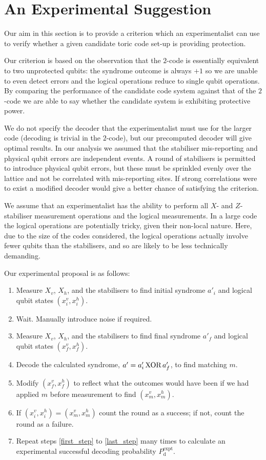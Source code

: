 \section{An Experimental Suggestion}

Our aim in this section is to provide a criterion which an experimentalist can use to verify whether a given candidate toric code set-up is providing protection.

Our criterion is based on the observation that the $2$-code is essentially equivalent to two unprotected qubits: the syndrome outcome is always $+1$ so we are unable to even detect errors and the logical operations reduce to single qubit operations. By comparing the performance of the candidate code system against that of the $2$-code we are able to say whether the candidate system is exhibiting protective power. 

We do not specify the decoder that the experimentalist must use for the larger code (decoding is trivial in the $2$-code), but our precomputed decoder will give optimal results. In our analysis we assumed that the stabiliser mis-reporting and physical qubit errors are independent events. A round of stabilisers is permitted to introduce physical qubit errors, but these must be sprinkled evenly over the lattice and not be correlated with mis-reporting sites. If strong correlations were to exist a modified decoder would give a better chance of satisfying the criterion.

We assume that an experimentalist has the ability to perform all $X$- and $Z$-stabiliser measurement operations and the logical measurements. In a large code the logical operations are potentially tricky, given their non-local nature. Here, due to the size of the codes considered, the logical operations actually involve fewer qubits than the stabilisers, and so are likely to be less technically demanding.

Our experimental proposal is as follows:
\begin{enumerate}
  \item Measure  $X_v$, $X_h$, and the stabilisers to find initial syndrome $a'_i$ and logical qubit states $(x^v_i, x^h_i).$\label{first_step}
  \item Wait. Manually introduce noise if required.
  \item Measure $X_v$, $X_h$, and the stabilisers to find final syndrome $a'_f$ and logical qubit states $(x^v_f, x^h_f)$.
  \item Decode the calculated syndrome, $a' = a'_i \text{\,XOR\,} a'_f$, to find matching $m$. \label{decode_step}
  \item Modify $(x^v_f, x^h_f)$ to reflect what the outcomes would have been if we had applied $m$ before measurement to find $(x^v_m, x^h_m)$.
  \item If $(x^v_i, x^h_i) = (x^v_m, x^h_m)$ count the round as a success; if not, count the round as a failure.\label{last_step}
  \item Repeat steps \ref{first_step} to \ref{last_step} many times to calculate an experimental successful decoding probability $P_\text{d}^\text{expt}$.
\end{enumerate}

